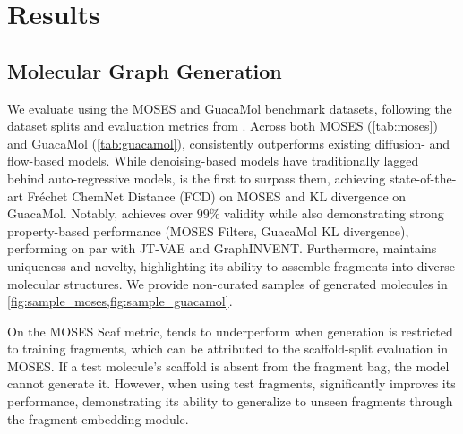 \section{Results}

\subsection{Molecular Graph Generation}
\label{subsec:molecular_graph_generation}



We evaluate \methodname{} using the MOSES \citep{moses} and GuacaMol \citep{guacamol} benchmark datasets, following the dataset splits and evaluation metrics from \citet{digress}. 
Across both MOSES (\cref{tab:moses}) and GuacaMol (\cref{tab:guacamol}), \methodname{} consistently outperforms existing diffusion- and flow-based models. 
While denoising-based models have traditionally lagged behind auto-regressive models, \methodname{} is the first to surpass them, achieving state-of-the-art Fréchet ChemNet Distance (FCD) on MOSES and KL divergence on GuacaMol. 
Notably, \methodname{} achieves over $99\%$ validity while also demonstrating strong property-based performance (MOSES Filters, GuacaMol KL divergence), performing on par with JT-VAE and GraphINVENT. 
Furthermore, \methodname{} maintains uniqueness and novelty, highlighting its ability to assemble fragments into diverse molecular structures. We provide non-curated samples of generated molecules in \cref{fig:sample_moses,fig:sample_guacamol}.

On the MOSES Scaf metric, \methodname{} tends to underperform when generation is restricted to training fragments, which can be attributed to the scaffold-split evaluation in MOSES. If a test molecule’s scaffold is absent from the fragment bag, the model cannot generate it. However, when using test fragments, \methodname{} significantly improves its performance, demonstrating its ability to generalize to unseen fragments through the fragment embedding module.


